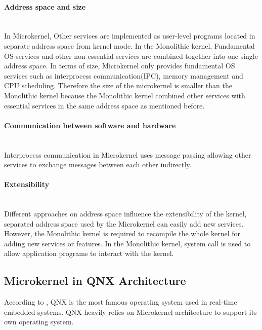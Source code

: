 \documentclass[conference]{IEEEtran}
\newcommand{\forceindent}{\leavevmode{\parindent=1em\indent}}
\begin{document}
\paragraph{Address space and size}\mbox{} \\
\forceindent In Microkernel, Other services are implemented as user-level programs located in separate address space from kernel mode\cite{Galvinbook}. In the Monolithic kernel, Fundamental OS services and other non-essential services are combined together into one single address space\cite{Galvinbook}.  In terms of size, Microkernel only provides fundamental OS services such as interprocess communication(IPC), memory management and CPU scheduling\cite{Galvinbook}. Therefore the size of the microkernel is smaller than the Monolithic kernel because the Monolithic kernel combined other services with essential services in the same address space as mentioned before.

\bigskip
\paragraph{Communication between software and hardware}\mbox{} \\
\forceindent Interprocess communication in Microkernel uses message passing\cite{Burger} allowing other services to exchange messages between each other indirectly.

\bigskip
\paragraph{Extensibility}\mbox{} \\
\forceindent Different approaches on address space influence the extensibility of the kernel, separated address space used by the Microkernel can easily add new services. However, the Monolithic kernel is required to recompile the whole kernel for adding new services or features\cite{educba}. In the Monolithic kernel, system call is used to allow application programs to interact with the kernel.

\medskip
\subsection{Microkernel in QNX Architecture}
According to \cite{embhack}, QNX is the most famous operating system used in real-time embedded systems. QNX  heavily relies on Microkernel architecture to support its own operating system\cite{Galvinbook}\cite{Burger}.
\end{document}

